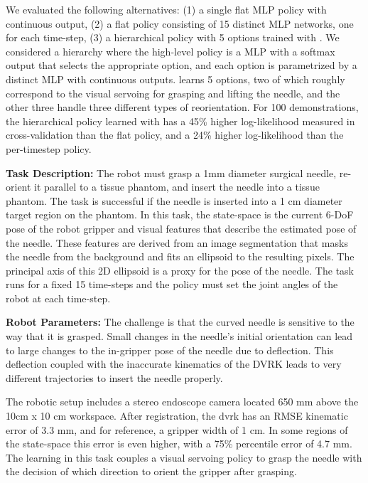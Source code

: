  We evaluated the following alternatives: (1) a single flat MLP policy with continuous output, (2) a flat policy consisting of 15 distinct MLP networks, one for each time-step, (3) a hierarchical policy with 5 options trained with \alg. We considered a hierarchy where the high-level policy is a MLP with a softmax output that selects the appropriate option, and each option is parametrized by a distinct MLP with continuous outputs.
 \alg learns 5 options, two of which roughly correspond to the visual servoing for grasping and lifting the needle, and the other three handle three different types of reorientation.
 For 100 demonstrations, the hierarchical policy learned with \alg has a 45\%  higher log-likelihood measured in cross-validation than the flat policy, and a 24\% higher log-likelihood than the per-timestep policy. 
 
\vspace{0.5em} \noindent \textbf{Task Description: } The robot must grasp a 1mm diameter surgical needle, re-orient it parallel to a tissue phantom, and insert the needle into a tissue phantom.
The task is successful if the needle is inserted into a 1 cm diameter target region on the phantom.
In this task, the state-space is the current 6-DoF pose of the robot gripper and visual features that describe the estimated pose of the needle.
These features are derived from an image segmentation that masks the needle from the background and fits an ellipsoid to the resulting pixels. 
The principal axis of this 2D ellipsoid is a proxy for the pose of the needle.
The task runs for a fixed 15 time-steps and the policy must set the joint angles of the robot at each time-step.

\vspace{0.5em} \noindent \textbf{Robot Parameters: } The challenge is that the curved needle is sensitive to the way that it is grasped. Small changes in the needle's initial orientation can lead to large changes to the in-gripper pose of the needle due to deflection.
This deflection coupled with the inaccurate kinematics of the DVRK leads to very different trajectories to insert the needle properly.

The robotic setup includes a stereo endoscope camera located 650 mm above the 10cm x 10 cm workspace.
After registration, the dvrk has an RMSE kinematic error of 3.3 mm, and for reference, a gripper width of 1 cm.
In some regions of the state-space this error is even higher, with a 75\% percentile error of 4.7 mm.
The learning in this task couples a visual servoing policy to grasp the needle with the decision of which direction to orient the gripper after grasping.

